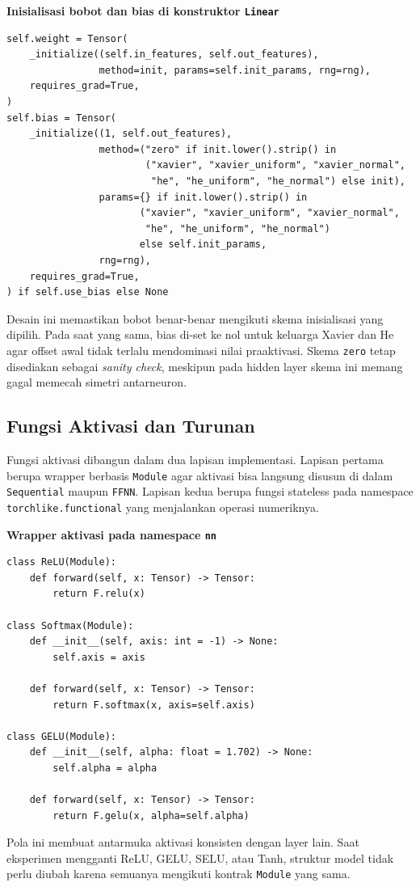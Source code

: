 \documentclass{article}
\begin{document}
\noindent\textbf{Inisialisasi bobot dan bias di konstruktor \texttt{Linear}}\par
\begin{lstlisting}
self.weight = Tensor(
    _initialize((self.in_features, self.out_features),
                method=init, params=self.init_params, rng=rng),
    requires_grad=True,
)
self.bias = Tensor(
    _initialize((1, self.out_features),
                method=("zero" if init.lower().strip() in
                        ("xavier", "xavier_uniform", "xavier_normal",
                         "he", "he_uniform", "he_normal") else init),
                params={} if init.lower().strip() in
                       ("xavier", "xavier_uniform", "xavier_normal",
                        "he", "he_uniform", "he_normal")
                       else self.init_params,
                rng=rng),
    requires_grad=True,
) if self.use_bias else None
\end{lstlisting}
Desain ini memastikan bobot benar-benar mengikuti skema inisialisasi yang dipilih. Pada saat yang sama, bias di-set ke nol untuk keluarga Xavier dan He agar offset awal tidak terlalu mendominasi nilai praaktivasi. Skema \texttt{zero} tetap disediakan sebagai \textit{sanity check}, meskipun pada hidden layer skema ini memang gagal memecah simetri antarneuron.

\subsection{Fungsi Aktivasi dan Turunan}
\label{subsec:aktivasi}
Fungsi aktivasi dibangun dalam dua lapisan implementasi. Lapisan pertama berupa wrapper berbasis \texttt{Module} agar aktivasi bisa langsung disusun di dalam \texttt{Sequential} maupun \texttt{FFNN}. Lapisan kedua berupa fungsi stateless pada namespace \texttt{torchlike.functional} yang menjalankan operasi numeriknya.

\noindent\textbf{Wrapper aktivasi pada namespace \texttt{nn}}\par
\begin{lstlisting}
class ReLU(Module):
    def forward(self, x: Tensor) -> Tensor:
        return F.relu(x)

class Softmax(Module):
    def __init__(self, axis: int = -1) -> None:
        self.axis = axis

    def forward(self, x: Tensor) -> Tensor:
        return F.softmax(x, axis=self.axis)

class GELU(Module):
    def __init__(self, alpha: float = 1.702) -> None:
        self.alpha = alpha

    def forward(self, x: Tensor) -> Tensor:
        return F.gelu(x, alpha=self.alpha)
\end{lstlisting}
Pola ini membuat antarmuka aktivasi konsisten dengan layer lain. Saat eksperimen mengganti ReLU, GELU, SELU, atau Tanh, struktur model tidak perlu diubah karena semuanya mengikuti kontrak \texttt{Module} yang sama.
\end{document}
